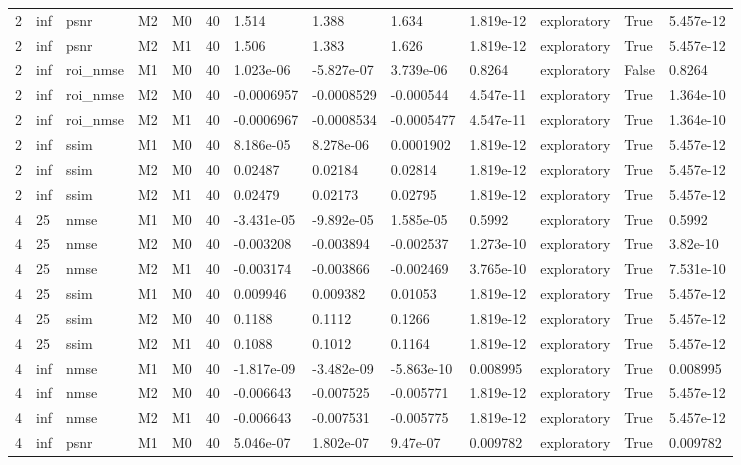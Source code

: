 \begin{tabular}{lllllllllllll}
2 & inf & psnr & M2 & M0 & 40 & 1.514 & 1.388 & 1.634 & 1.819e-12 & exploratory & True & 5.457e-12 \\
2 & inf & psnr & M2 & M1 & 40 & 1.506 & 1.383 & 1.626 & 1.819e-12 & exploratory & True & 5.457e-12 \\
2 & inf & roi\_nmse & M1 & M0 & 40 & 1.023e-06 & -5.827e-07 & 3.739e-06 & 0.8264 & exploratory & False & 0.8264 \\
2 & inf & roi\_nmse & M2 & M0 & 40 & -0.0006957 & -0.0008529 & -0.000544 & 4.547e-11 & exploratory & True & 1.364e-10 \\
2 & inf & roi\_nmse & M2 & M1 & 40 & -0.0006967 & -0.0008534 & -0.0005477 & 4.547e-11 & exploratory & True & 1.364e-10 \\
2 & inf & ssim & M1 & M0 & 40 & 8.186e-05 & 8.278e-06 & 0.0001902 & 1.819e-12 & exploratory & True & 5.457e-12 \\
2 & inf & ssim & M2 & M0 & 40 & 0.02487 & 0.02184 & 0.02814 & 1.819e-12 & exploratory & True & 5.457e-12 \\
2 & inf & ssim & M2 & M1 & 40 & 0.02479 & 0.02173 & 0.02795 & 1.819e-12 & exploratory & True & 5.457e-12 \\
4 & 25 & nmse & M1 & M0 & 40 & -3.431e-05 & -9.892e-05 & 1.585e-05 & 0.5992 & exploratory & True & 0.5992 \\
4 & 25 & nmse & M2 & M0 & 40 & -0.003208 & -0.003894 & -0.002537 & 1.273e-10 & exploratory & True & 3.82e-10 \\
4 & 25 & nmse & M2 & M1 & 40 & -0.003174 & -0.003866 & -0.002469 & 3.765e-10 & exploratory & True & 7.531e-10 \\
4 & 25 & ssim & M1 & M0 & 40 & 0.009946 & 0.009382 & 0.01053 & 1.819e-12 & exploratory & True & 5.457e-12 \\
4 & 25 & ssim & M2 & M0 & 40 & 0.1188 & 0.1112 & 0.1266 & 1.819e-12 & exploratory & True & 5.457e-12 \\
4 & 25 & ssim & M2 & M1 & 40 & 0.1088 & 0.1012 & 0.1164 & 1.819e-12 & exploratory & True & 5.457e-12 \\
4 & inf & nmse & M1 & M0 & 40 & -1.817e-09 & -3.482e-09 & -5.863e-10 & 0.008995 & exploratory & True & 0.008995 \\
4 & inf & nmse & M2 & M0 & 40 & -0.006643 & -0.007525 & -0.005771 & 1.819e-12 & exploratory & True & 5.457e-12 \\
4 & inf & nmse & M2 & M1 & 40 & -0.006643 & -0.007531 & -0.005775 & 1.819e-12 & exploratory & True & 5.457e-12 \\
4 & inf & psnr & M1 & M0 & 40 & 5.046e-07 & 1.802e-07 & 9.47e-07 & 0.009782 & exploratory & True & 0.009782 \\

\end{tabular}
